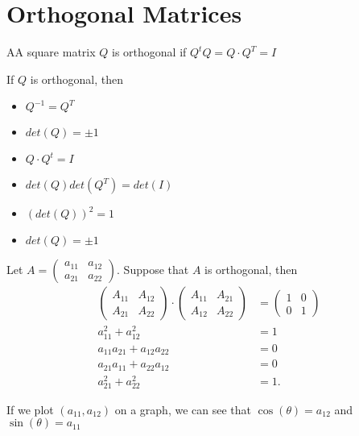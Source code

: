 \section{}
\section{Orthogonal Matrices}

  \begin{definition}
    AA square matrix $Q$ is orthogonal if $Q^{t}Q=Q\cdot Q^{T}=I$
  \end{definition}

  If $Q$ is orthogonal, then
  \begin{itemize}
    \item $Q^{-1}=Q^{T}$
    \item $det(Q)=\pm 1$
    \item $Q\cdot Q^{t}=I$
    \item $det(Q)det(Q^{T})=det(I)$
    \item $(det(Q))^2=1$
    \item $det(Q)=\pm 1$
  \end{itemize}

  Let $A=\begin{pmatrix} a_{11}&a_{12}\\a_{21}&a_{22} \end{pmatrix} $. Suppose that $A$ is orthogonal, then 
  \begin{align*}
    \begin{pmatrix} A_{11}&A_{12}\\A_{21}&A_{22} \end{pmatrix}\cdot\begin{pmatrix} A_{11}&A_{21}\\A_{12}&A_{22} \end{pmatrix} &=\begin{pmatrix} 1&0\\0&1 \end{pmatrix} \\
    a_{11}^2+a_{12}^2&=1\\
    a_{11}a_{21}+a_{12}a_{22}&=0\\
    a_{21}a_{11}+a_{22}a_{12}&=0\\
    a_{21}^2+a_{22}^2&=1
  .\end{align*}
  
  If we plot $(a_{11},a_{12})$ on a graph, we can see that $\cos\left( \theta \right) =a_{12}$ and $\sin(\theta)=a_{11} $


